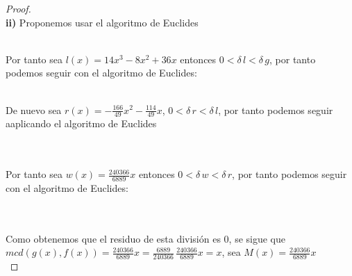 \documentclass[11pt,letterpaper]{article}
\begin{document}
\begin{proof}
\,\\
\textbf{ii)}\,\,Proponemos usar el algoritmo de Euclides
    \,\\
    \begin{center}
\end{center}\,\\
Por tanto sea $l(x)=14x^3-8x^2+36x$ entonces $0<\delta\,l< \delta\,g$, por tanto podemos seguir con el algoritmo 
de Euclides:\,\\
\begin{center}
\end{center}\,\\
De nuevo sea $r(x)=-\frac{166}{49}x^2-\frac{114}{49}x$, $0<\delta\,r<\delta\,l$, por tanto podemos seguir aaplicando el algoritmo de Euclides\,\\
\,\\
\begin{center}
\end{center}\,\\
Por tanto sea $w(x)=\frac{240366}{6889}x$ entonces $0<\delta\,w< \delta\,r$, por tanto podemos seguir con el algoritmo 
de Euclides:\,\\
\,\\
\begin{center}
\end{center}\,\\
Como obtenemos que el residuo de esta divisi\'on es $0$, se sigue que\\ $mcd(g(x),f(x))=\frac{240366}{6889}x=\frac{6889}{240366}\,\frac{240366}{6889}x=x$, sea
$M(x)=\frac{240366}{6889}x$\,\\
\end{proof}\,\\
\end{document}
